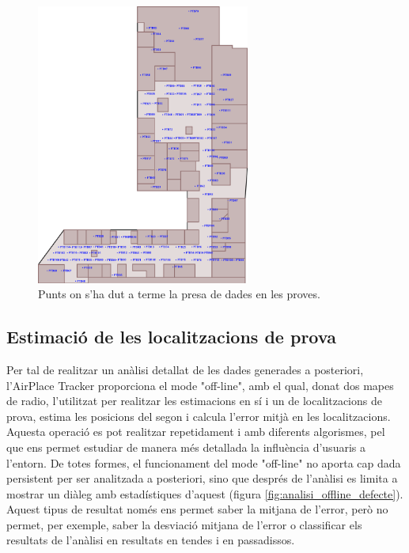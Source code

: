 \begin{figure}[ht]
\begin{center}
\includegraphics[width=7cm]{imatges/planol_proves.png}
\caption{Punts on s'ha dut a terme la presa de dades en les proves.}
\label{fig:planol_proves}
\end{center}
\end{figure}

\subsection{Estimació de les localitzacions de prova}

Per tal de realitzar un anàlisi detallat de les dades generades a posteriori, l'AirPlace Tracker proporciona el mode "off-line", amb el qual, donat dos mapes de radio, l'utilitzat per realitzar les estimacions en sí i un de localitzacions de prova, estima les posicions del segon i calcula l'error mitjà en les localitzacions. Aquesta operació es pot realitzar repetidament i amb diferents algorismes, pel que ens permet estudiar de manera més detallada la influència d'usuaris a l'entorn. De totes formes, el funcionament del mode "off-line" no aporta cap dada persistent per ser analitzada a posteriori, sino que després de l'anàlisi es limita a mostrar un diàleg amb estadístiques d'aquest (figura \ref{fig:analisi_offline_defecte}). Aquest tipus de resultat només ens permet saber la mitjana de l'error, però no permet, per exemple, saber la desviació mitjana de l'error o classificar els resultats de l'anàlisi en resultats en tendes i en passadissos.

